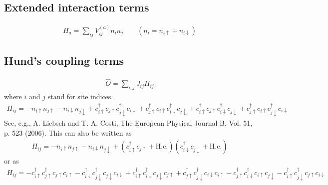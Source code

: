 \documentclass[letterpaper,10pt,english]{sphinxmanual}
\begin{document}
\subsection{Extended interaction terms}
\label{\detokenize{models:extended-interaction-terms}}\begin{equation*}
\begin{split}H_a = \sum_{ij} V^{(a)}_{ij} n_i n_j \qquad (n_i = n_{i\uparrow}+n_{i\downarrow})\end{split}
\end{equation*}

\subsection{Hund’s coupling terms}
\label{\detokenize{models:hund-s-coupling-terms}}\begin{equation*}
\begin{split}\hat O = \sum_{i,j} J_{ij} H_{ij}\end{split}
\end{equation*}
\sphinxAtStartPar
where \(i\) and \(j\) stand for site indices.
\begin{equation*}
\begin{split}H_{ij} = -n_{i\uparrow}n_{j\uparrow} - n_{i\downarrow}n_{j\downarrow} + c^\dagger_{i\uparrow}c_{j\uparrow}c^\dagger_{j\downarrow}c_{i\downarrow}
+ c^\dagger_{j\uparrow}c_{i\uparrow}c^\dagger_{i\downarrow}c_{j\downarrow}
+ c^\dagger_{i\uparrow}c_{j\uparrow}c^\dagger_{i\downarrow}c_{j\downarrow}
+ c^\dagger_{j\uparrow}c_{i\uparrow}c^\dagger_{j\downarrow}c_{i\downarrow}\end{split}
\end{equation*}
\sphinxAtStartPar
See, e.g., A. Liebsch and  T. A. Costi, The European Physical Journal B, Vol. 51, p. 523 (2006).
This can also be written as
\begin{equation*}
\begin{split}H_{ij} = -n_{i\uparrow}n_{j\uparrow} - n_{i\downarrow}n_{j\downarrow}
+ (c^\dagger_{i\uparrow}c_{j\uparrow}+\mathrm{H.c.})(c^\dagger_{i\downarrow}c_{j\downarrow}+ \mathrm{H.c.})\end{split}
\end{equation*}
\sphinxAtStartPar
or as
\begin{equation*}
\begin{split}H_{ij} = -c^\dagger_{i\uparrow}c^\dagger_{j\uparrow}c_{j\uparrow}c_{i\uparrow} - c^\dagger_{i\downarrow}c^\dagger_{j\downarrow}c_{j\downarrow}c_{i\downarrow}
+ c^\dagger_{i\uparrow}c^\dagger_{i\downarrow}c_{j\downarrow}c_{j\uparrow}
+ c^\dagger_{j\uparrow}c^\dagger_{j\downarrow}c_{i\downarrow}c_{i\uparrow}
- c^\dagger_{j\uparrow}c^\dagger_{i\downarrow}c_{i\uparrow}c_{j\downarrow}
- c^\dagger_{i\uparrow}c^\dagger_{j\downarrow}c_{j\uparrow}c_{i\downarrow}\end{split}
\end{equation*}
\end{document}
